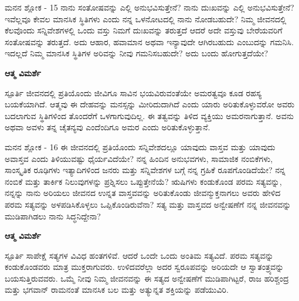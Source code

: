 \begin{mananam}{\mananamfont ಮನನ ಶ್ಲೋಕ - \textenglish{15}}
\footnotesize \mananamtext ನಾನು ಸಂತೋಷವನ್ನು ಎಲ್ಲಿ ಅನುಭವಿಸುತ್ತೇನೆ? ನಾನು ದುಃಖವನ್ನು ಎಲ್ಲಿ ಅನುಭವಿಸುತ್ತೇನೆ? ಇವೆಲ್ಲವೂ ಕೇವಲ ಮಾನಸಿಕ ಸ್ಥಿತಿಗಳು ಎಂದು ನನ್ನ ಒಳನೋಟದಲ್ಲಿ ನಾನು ನೋಡಬಹುದೇ? ನಿಮ್ಮ ಜೀವನದಲ್ಲಿ ಕೆಲವೊಂದು ಸನ್ನಿವೇಶಗಳಲ್ಲಿ ಒಂದು ವಸ್ತು ನಿಮಗೆ ದುಃಖವನ್ನು ತರುತ್ತದೆ ಆದರೆ ಅದೇ ವಸ್ತುವು ಬೇರೆಯವರಿಗೆ ಸಂತೋಷವನ್ನು ತರುತ್ತದೆ. ಅದು ಆಹಾರ, ಹವಾಮಾನ ಅಥವಾ ಇನ್ಯಾವುದೇ ಆಗಿರಬಹುದು ಎಂಬುದನ್ನು ಗಮನಿಸಿ. ಇದಲ್ಲದೆ ನಿಮ್ಮ ಮಾನಸಿಕ ಸ್ಥಿತಿಗಳ ಅರಿವನ್ನು ನೀವು ಗಮನಿಸಬಹುದೇ? ಅದು ಬಂದು ಹೋಗುತ್ತದೆಯೇ?
\end{mananam}
\WritingHand\enspace\textbf{ಆತ್ಮ ವಿಮರ್ಶೆ}
\begin{inspiration}{\mananamfont ಸ್ಪೂರ್ತಿ}
\footnotesize \mananamtext ಜೀವನದಲ್ಲಿ ಪ್ರತಿಯೊಂದು ಜೀವಿಗೂ ಸಾವಿನ ಭಯವಿರುವಂತೆಯೇ ಅಮರತ್ವವೂ ಕೂಡ ರಹಸ್ಯ ಬಯಕೆಯಾಗಿದೆ. ಆತ್ಮವು ಈ ದೇಹವನ್ನು ಮನಸ್ಸನ್ನು ಮೀರಿದುದಾಗಿದೆ ಎಂದು ಯಾರು ಅರಿತುಕೊಳ್ಳುವರೋ ಅವರು ಬದಲಾಗುವ ಸ್ಥಿತಿಗಳಿಂದ ತೊಂದರೆಗೆ ಒಳಗಾಗುವುದಿಲ್ಲ. ಈ ತತ್ವವನ್ನು ತಿಳಿದ ವ್ಯಕ್ತಿಯು ಅಮರನಾಗುತ್ತಾನೆ. ಅವನು ಅಥವಾ ಅವಳು ತನ್ನ ಚೈತನ್ಯವು ಎಂದೆಂದಿಗೂ ಅಮರ ಎಂದು ಅರಿತುಕೊಳ್ಳುತ್ತಾನೆ.
\end{inspiration}

\newpage
\begin{mananam}{\mananamfont ಮನನ ಶ್ಲೋಕ - \textenglish{16}}
\footnotesize \mananamtext ಈ ಜೀವನದಲ್ಲಿ ಪ್ರತಿಯೊಂದು ಸನ್ನಿವೇಶದಲ್ಲೂ ಯಾವುದು ವಾಸ್ತವ ಮತ್ತು ಯಾವುದು ಅವಾಸ್ತವ ಎಂದು ತಿಳಿಯುವಷ್ಟು ಧೈರ್ಯವಿದೆಯೇ? ನನ್ನ ಹಿಂದಿನ ಅನುಭವಗಳು, ಸಾಮಾಜಿಕ ನಂಬಿಕೆಗಳು, ಸಾಂಸ್ಕೃತಿಕ ರೂಢಿಗಳು ಇತ್ಯಾದಿಗಳಿಂದ ಜನರು ಮತ್ತು ಸನ್ನಿವೇಶಗಳ ಬಗ್ಗೆ ನನ್ನ ಗ್ರಹಿಕೆ ರೂಪಗೊಂಡಿದೆಯೇ? ನನ್ನ ನಂಬಿಕೆ ಮತ್ತು ತಾರ್ಕಿಕ ನಿಲುವುಗಳನ್ನು ಪ್ರಶ್ನಿಸಲು ಒಪ್ಪುತ್ತೇನೆಯೆ? ಋಷಿಗಳು ಕಂಡುಕೊಂಡ ಪರಮ ಸತ್ಯವನ್ನು, ನನ್ನನ್ನು ನಾನು ಅರಿಯಲು ಜೀವನದ ಉನ್ನತ ವಾಸ್ತವವನ್ನು ಅರಿತುಕೊಂಡು ಜೀವನ್ಮುಕ್ತನಾಗಲು ಅವರು ಹೇಳಿದ ಪರಮ ಸತ್ಯವನ್ನು ಅಳಪಡಿಸಿಕೊಳ್ಳಲು ಒಪ್ಪಿಕೊಂಡಿರುವೆನಾ? ಸತ್ಯ ಮತ್ತು ವಾಸ್ತವದ ಅನ್ವೇಷಣೆಗೆ ನನ್ನ ಜೀವನವನ್ನು ಮುಡಿಪಾಗಿಡಲು ನಾನು ಸಿದ್ಧನಿದ್ದೇನಾ?
\end{mananam}
\WritingHand\enspace\textbf{ಆತ್ಮ ವಿಮರ್ಶೆ}
\begin{inspiration}{\mananamfont ಸ್ಪೂರ್ತಿ}
\footnotesize \mananamtext ಸಾಪೇಕ್ಷೆ ಸತ್ಯಗಳ ವಿವಿಧ ಹಂತಗಳಿವೆ. ಆದರೆ ಒಂದೇ ಒಂದು ಅಂತಿಮ ಸತ್ಯವಿದೆ. ಪರಮ ಸತ್ಯವನ್ನು ಕಂಡುಕೊಂಡವರು ಮಾತ್ರ ಮುಕ್ತರಾಗುವರು. ಉಳಿದವರೆಲ್ಲಾ ಅದರ ಸ್ವರೂಪವನ್ನು ಅರಿಯದೇ ಆ ಸ್ವಾತಂತ್ರ್ಯವನ್ನು ಬಯಸುತ್ತಿರುವವರು. ಒಮ್ಮೆ ನೀವು ನಿಮ್ಮ ಜೀವನವನ್ನು ಈ ಸತ್ಯದ ಅನ್ವೇಷಣೆಗೆ ಮುಡಿಪಾಗಿಟ್ಟರೆ, ರಾಜ ಹರಿಶ್ಚಂದ್ರ ಮತ್ತು ಭಗವಾನ್ ರಾಮನಂತೆ ಮಾನಸಿಕ ಬಲ ಮತ್ತು ಅತ್ಯುನ್ನತ ಶಕ್ತಿಯನ್ನು ಪಡೆಯುವಿರಿ.
\end{inspiration}
\newpage

